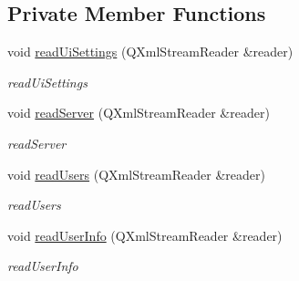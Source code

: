 \subsection*{Private Member Functions}
\begin{DoxyCompactItemize}
\item 
void \hyperlink{classserver_1_1cls_settings_adbc68e6d583e346496479ace0f590000}{read\-Ui\-Settings} (Q\-Xml\-Stream\-Reader \&reader)
\begin{DoxyCompactList}\small\item\em read\-Ui\-Settings \end{DoxyCompactList}\item 
void \hyperlink{classserver_1_1cls_settings_a52c740c0cbe7683fe82797a11a4fffd0}{read\-Server} (Q\-Xml\-Stream\-Reader \&reader)
\begin{DoxyCompactList}\small\item\em read\-Server \end{DoxyCompactList}\item 
void \hyperlink{classserver_1_1cls_settings_aa4eefe64194d1d21f5c9414355f3f5f3}{read\-Users} (Q\-Xml\-Stream\-Reader \&reader)
\begin{DoxyCompactList}\small\item\em read\-Users \end{DoxyCompactList}\item 
void \hyperlink{classserver_1_1cls_settings_abc09034b2b4c0e9419051b71a4d2d299}{read\-User\-Info} (Q\-Xml\-Stream\-Reader \&reader)
\begin{DoxyCompactList}\small\item\em read\-User\-Info \end{DoxyCompactList}\end{DoxyCompactItemize}
